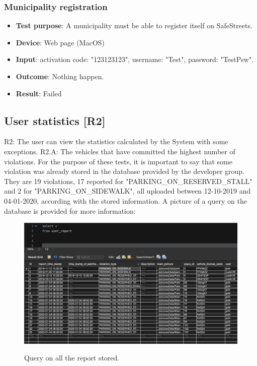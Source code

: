 \documentclass[../ATD.tex]{subfiles}
\begin{document}
    \subsubsection{Municipality registration}\label{subsubsec:municipality-registration}
    \begin{itemize}
        \item \textbf{Test purpose}: A municipality must be able to register itself on SafeStreets.
        \item \textbf{Device}: Web page (MacOS)
        \item \textbf{Input}: activation code: "123123123", username: "Test", password: "TestPsw".
        \item \textbf{Outcome}: Nothing happen.
        \item \textbf{Result}: Failed
    \end{itemize}

    \subsection{User statistics [R2]}\label{subsec:user-statistics}
    R2: The user can view the statistics calculated by the System with some exceptions.
    \newline
    R2.A: The vehicles that have committed the highest number of violations.
    \newline
    For the purpose of these tests, it is important to say that some violation was already stored in the database provided by the developer group.
    They are 19 violations, 17 reported for "PARKING\_ON\_RESERVED\_STALL" and 2 for "PARKING\_ON\_SIDEWALK", all uploaded between 12-10-2019 and 04-01-2020, according with the stored information.
    A picture of a query on the database is provided for more information:

    \begin{figure}[H]
        \centering
        \includegraphics[scale = 0.5]{assets/database_user_report.png}\\
        \caption[Query on all the report stored]{Query on all the report stored.}
    \end{figure}
\end{document}

